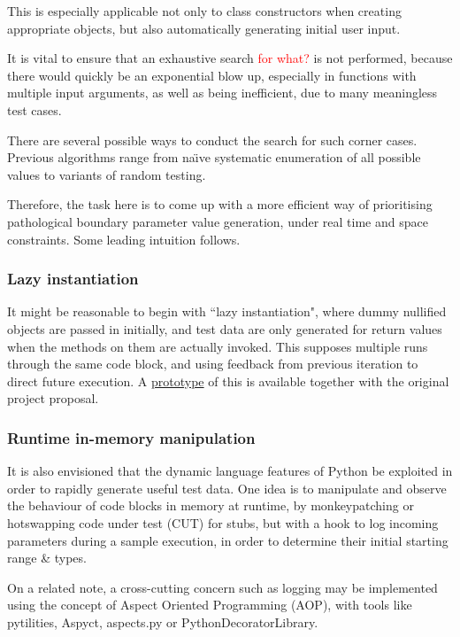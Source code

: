 \documentclass{icldt}
\numberwithin{equation}{section}       %
\def\naive{na\"{\i}ve }
\begin{document}
This is especially applicable not only to class constructors when creating appropriate objects, but also automatically generating initial user input.

It is vital to ensure that an exhaustive search \textcolor{red}{for what?} is not performed, because there would quickly be an exponential blow up, especially in functions with multiple input arguments, as well as being inefficient, due to many meaningless test cases.

There are several possible ways to conduct the search for such corner cases. Previous algorithms range from \naive systematic enumeration of all possible values to variants of random testing.

Therefore, the task here is to come up with a more efficient way of prioritising pathological boundary parameter value generation, under real time and space constraints. Some leading intuition follows.
\subsubsection{Lazy instantiation}
It might be reasonable to begin with ``lazy instantiation"\cite{Allwood2011}, where dummy nullified objects are passed in initially, and test data are only generated for return values when the methods on them are actually invoked. This supposes multiple runs through the same code block, and using feedback from previous iteration to direct future execution. A \href{https://github.com/evandrix/Splat}{prototype} of this is available together with the original project proposal.

\subsubsection{Runtime in-memory manipulation}
It is also envisioned that the dynamic language features of Python be exploited in order to rapidly generate useful test data. One idea is to manipulate and observe the behaviour of code blocks in memory at runtime, by monkeypatching or hotswapping code under test (CUT) for stubs, but with a hook to log incoming parameters during a sample execution, in order to determine their initial starting range \& types.

On a related note, a cross-cutting concern such as logging may be implemented using the concept of Aspect Oriented Programming (AOP), with tools like pytilities, Aspyct, aspects.py or PythonDecoratorLibrary.
\end{document}
